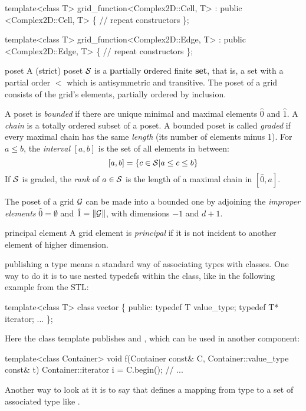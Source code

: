 \begin{Glossar}
\begin{example}
  template<class T>
  grid_function<Complex2D::Cell, T> 
    : public <Complex2D::Cell, T> \{
    // repeat constructors
  \};

  template<class T>
  grid_function<Complex2D::Edge, T> 
    : public <Complex2D::Edge, T> \{
    // repeat constructors
  \};
  \end{example}

\item[poset]
A (strict) poset ${\cal S}$ is a {\bf p}artially {\bf o}rdered finite {\bf set}, 
that is, a set with a partial order $<$ 
which is antisymmetric and transitive. 
The poset of a grid consists of the grid's elements,
partially ordered by inclusion.

A poset is {\sl bounded\/} if there are unique minimal and maximal elements
$\hat{0}$ and $\hat{1}$.
A {\sl chain\/} is a totally ordered subset of a poset. A bounded poset
is called {\sl graded\/} if every maximal chain has the same {\sl length}
(its number of elements minus 1). 
For $ a \leq b$, the {\sl interval\/} $[a,b]$ 
is the set of all elements in between:
\[
  [a,b] = \{ c \in {\cal S} | a \leq c \leq b \}
\]
If ${\cal S}$ is graded, the {\sl rank\/} of $a \in {\cal S}$ is the length
of a maximal chain in $[\hat{0},a]$.

The poset of a grid ${\cal G}$ can be made into a bounded one by adjoining
the {\sl improper elements\/}  $\hat{0} = \emptyset$
and $\hat{1} = \|{\cal G}\|$, with dimensions $-1$ and $d+1$.

\item[principal element] 
A grid element is \emph{principal} if it is not incident to 
another element of higher dimension. 
  
\item[publishing a type] means a standard way of associating types with classes.
  One way to do it is to use nested typedefs within the class, like in the following
  example from the STL:
  \begin{example}
   template<class T>
   class vector \{
   public:
     typedef T  value_type;
     typedef T* iterator;
     ...
   \};
  \end{example}
  Here the class template  publishes  and ,
  which can be used in another component:
  \begin{example}
    template<class Container>
    void f(Container const& C, Container::value_type const& t) {
      Container::iterator i = C.begin();
      // ...
    }
  \end{example}
  Another way to look at it is to say that  defines
  a mapping from type  to a set of associated type like
  .


\end{Glossar}
